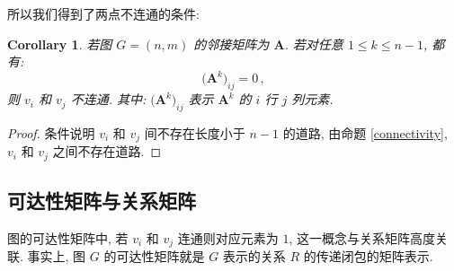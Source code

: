 \documentclass[UTF8]{ctexart}
\theoremstyle{mystyle}
\theoremstyle{myremark}
\theoremstyle{plain}
\newtheorem{corollary}{Corollary}[section]
\newcommand{\ve}[1]{\boldsymbol{\mathbf{#1}}}
\begin{document}
所以我们得到了两点不连通的条件:
\begin{corollary}
    若图 $ G = (n, m) $ 的邻接矩阵为 $ \ve A $. 若对任意 $ 1 \leqslant k \leqslant n - 1 $, 都有:
    \[ 
        \bigl( \ve A^k \bigr)_{ij} = 0 \,,
    \]
    则 $ v_i $ 和 $ v_j $ 不连通. 其中: $ \bigl( \ve A^k \bigr)_{ij} $ 表示 $ \ve A^k $ 的 $ i $ 行 $ j $ 列元素.
\end{corollary}

\begin{proof}
    条件说明 $ v_i $ 和 $ v_j $ 间不存在长度小于 $ n - 1 $ 的道路, 由命题 \ref{connectivity}, $ v_i $ 和 $ v_j $ 之间不存在道路.
\end{proof}


\subsection{可达性矩阵与关系矩阵}
图的可达性矩阵中, 若 $ v_i $ 和 $ v_j $ 连通则对应元素为 $ 1 $, 这一概念与关系矩阵高度关联. 事实上, 图 $ G $ 的可达性矩阵就是 $ G $ 表示的关系 $ R $ 的传递闭包的矩阵表示.
\end{document}
